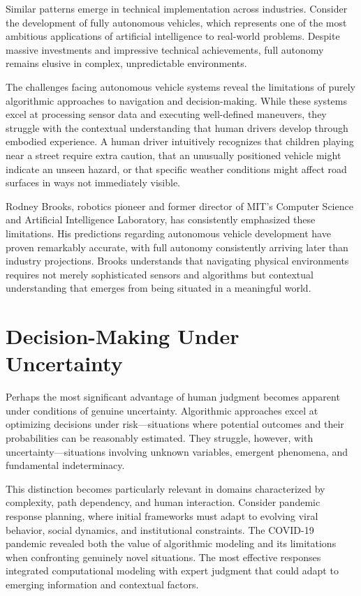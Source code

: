 \documentclass[
  Letterpaper,
]{scrbook}
\begin{document}
Similar patterns emerge in technical implementation across industries.
Consider the development of fully autonomous vehicles, which represents
one of the most ambitious applications of artificial intelligence to
real-world problems. Despite massive investments and impressive
technical achievements, full autonomy remains elusive in complex,
unpredictable environments.

The challenges facing autonomous vehicle systems reveal the limitations
of purely algorithmic approaches to navigation and decision-making.
While these systems excel at processing sensor data and executing
well-defined maneuvers, they struggle with the contextual understanding
that human drivers develop through embodied experience. A human driver
intuitively recognizes that children playing near a street require extra
caution, that an unusually positioned vehicle might indicate an unseen
hazard, or that specific weather conditions might affect road surfaces
in ways not immediately visible.

Rodney Brooks, robotics pioneer and former director of MIT's Computer
Science and Artificial Intelligence Laboratory, has consistently
emphasized these limitations. His predictions regarding autonomous
vehicle development have proven remarkably accurate, with full autonomy
consistently arriving later than industry projections. Brooks
understands that navigating physical environments requires not merely
sophisticated sensors and algorithms but contextual understanding that
emerges from being situated in a meaningful world.

\section{Decision-Making Under
Uncertainty}\label{decision-making-under-uncertainty}

Perhaps the most significant advantage of human judgment becomes
apparent under conditions of genuine uncertainty. Algorithmic approaches
excel at optimizing decisions under risk---situations where potential
outcomes and their probabilities can be reasonably estimated. They
struggle, however, with uncertainty---situations involving unknown
variables, emergent phenomena, and fundamental indeterminacy.

This distinction becomes particularly relevant in domains characterized
by complexity, path dependency, and human interaction. Consider pandemic
response planning, where initial frameworks must adapt to evolving viral
behavior, social dynamics, and institutional constraints. The COVID-19
pandemic revealed both the value of algorithmic modeling and its
limitations when confronting genuinely novel situations. The most
effective responses integrated computational modeling with expert
judgment that could adapt to emerging information and contextual
factors.
\end{document}
